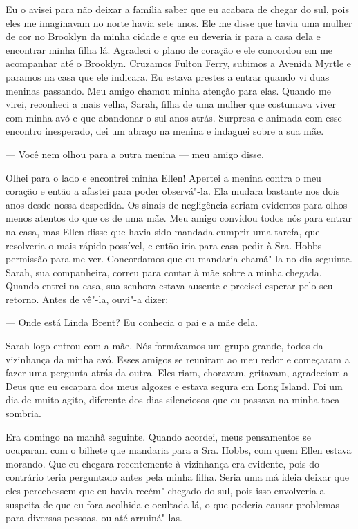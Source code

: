 Eu o avisei para não deixar a família
saber que eu acabara de chegar do sul, pois eles me imaginavam no norte
havia sete anos. Ele me disse que havia uma mulher de cor no Brooklyn da
minha cidade e que eu deveria ir para a casa dela e encontrar minha
filha lá. Agradeci o plano de coração e ele concordou em me acompanhar
até o Brooklyn. Cruzamos Fulton Ferry, subimos a Avenida Myrtle e
paramos na casa que ele indicara. Eu estava prestes a entrar quando vi
duas meninas passando. Meu amigo chamou minha atenção para elas. Quando
me virei, reconheci a mais velha, Sarah, filha de uma mulher que
costumava viver com minha avó e que abandonar o sul anos atrás. Surpresa
e animada com esse encontro inesperado, dei um abraço na menina e
indaguei sobre a sua mãe.

--- Você nem olhou para a outra menina
--- meu amigo disse.

Olhei para o lado e encontrei minha Ellen! Apertei a menina contra o meu
coração e então a afastei para poder observá"-la. Ela mudara bastante nos
dois anos desde nossa despedida. Os sinais de negligência seriam
evidentes para olhos menos atentos do que os de uma mãe. Meu amigo
convidou todos nós para entrar na casa, mas Ellen disse que havia sido
mandada cumprir uma tarefa, que resolveria o mais rápido possível, e
então iria para casa pedir à Sra. Hobbs permissão para me ver.
Concordamos que eu mandaria chamá"-la no dia seguinte. Sarah, sua
companheira, correu para contar à mãe sobre a minha chegada. Quando
entrei na casa, sua senhora estava ausente e precisei esperar pelo seu
retorno. Antes de vê"-la, ouvi"-a dizer:

--- Onde está Linda Brent? Eu conhecia o pai e a mãe dela.

Sarah logo entrou com a mãe. Nós formávamos um grupo grande, todos da
vizinhança da minha avó. Esses amigos se reuniram ao meu redor e
começaram a fazer uma pergunta atrás da outra. Eles riam, choravam,
gritavam, agradeciam a Deus que eu escapara dos meus algozes e estava
segura em Long Island. Foi um dia de muito agito, diferente dos dias
silenciosos que eu passava na minha toca sombria.

Era domingo na manhã seguinte. Quando
acordei, meus pensamentos se ocuparam com o bilhete que mandaria para a
Sra. Hobbs, com quem Ellen estava morando. Que eu chegara recentemente à
vizinhança era evidente, pois do contrário teria perguntado antes pela
minha filha. Seria uma má ideia deixar que eles percebessem que eu havia
recém"-chegado do sul, pois isso envolveria a suspeita de que eu fora
acolhida e ocultada lá, o que poderia causar problemas para diversas
pessoas, ou até arruiná"-las.

